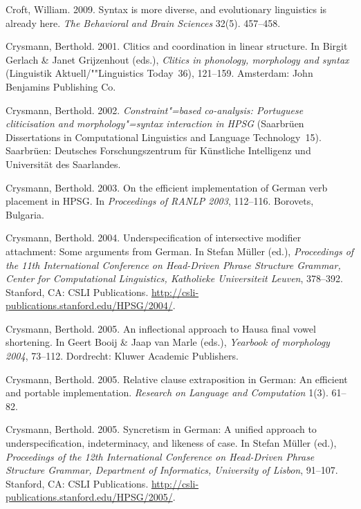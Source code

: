 \begin{thebibliography}{1420}
Croft, William. 2009.
\newblock Syntax is more diverse, and evolutionary linguistics is already here.
\newblock \emph{The Behavioral and Brain Sciences} 32(5). 457--458.

Crysmann, Berthold. 2001.
\newblock Clitics and coordination in linear structure.
\newblock In Birgit Gerlach \& Janet Grijzenhout (eds.), \emph{Clitics in
  phonology, morphology and syntax} (Linguistik Aktuell/""Linguistics
  Today~36), 121--159. Amsterdam: John Benjamins Publishing Co.

Crysmann, Berthold. 2002.
\newblock \emph{Constraint"=based co-analysis: {Portuguese} cliticisation and
  morphology"=syntax interaction in {HPSG}}
  (Saar\-br{\"u}en Dissertations in Computational
  Linguistics and Language Technology~15).
\newblock Saar\-br{\"u}en: Deutsches Forschungszentrum
  f{\"u}r K{\"u}nstliche Intelligenz und Uni\-ver\-si\-t{\"a}t des Saarlandes.

Crysmann, Berthold. 2003.
\newblock On the efficient implementation of {German} verb placement in {HPSG}.
\newblock In \emph{Proceedings of {RANLP} 2003}, 112--116. Borovets, Bulgaria.

Crysmann, Berthold. 2004.
\newblock Underspecification of intersective modifier attachment: {Some}
  arguments from {German}.
\newblock In Stefan M{\"u}ller (ed.), \emph{Proceedings of the {11th
  International Conference on Head-Driven Phrase Structure Grammar, Center for
  Computational Linguistics, Katholieke Universiteit Leuven}}, 378--392.
  Stanford, CA: CSLI Publications.
\newblock \urlprefix\url{http://csli-publications.stanford.edu/HPSG/2004/}.

Crysmann, Berthold. 2005{}.
\newblock An inflectional approach to {Hausa} final vowel shortening.
\newblock In Geert Booij \& Jaap van Marle (eds.), \emph{Yearbook of morphology
  2004}, 73--112. Dordrecht: Kluwer Academic Publishers.

Crysmann, Berthold. 2005{}.
\newblock Relative clause extraposition in {German}: {An} efficient and
  portable implementation.
\newblock \emph{Research on Language and Computation} 1(3). 61--82.

Crysmann, Berthold. 2005{}.
\newblock Syncretism in {German}: {A} unified approach to underspecification,
  indeterminacy, and likeness of case.
\newblock In Stefan M{\"u}ller (ed.), \emph{Proceedings of the {12th
  International Conference on Head-Driven Phrase Structure Grammar, Department
  of Informatics, University of Lisbon}}, 91--107. Stanford, CA: CSLI
  Publications.
\newblock \urlprefix\url{http://csli-publications.stanford.edu/HPSG/2005/}.


\end{thebibliography}
